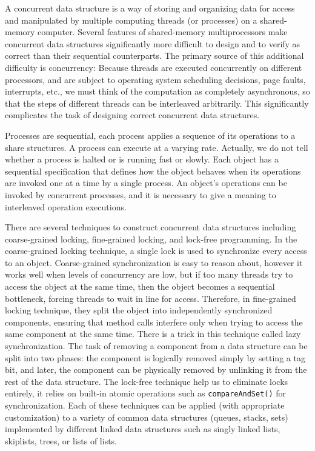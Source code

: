 A concurrent data structure is a way of storing and organizing data for access and manipulated by multiple computing threads (or processes) on a shared-memory computer. Several features of shared-memory multiprocessors make concurrent data structures significantly more difficult to design and to verify as correct than their sequential counterparts. The primary source of this additional difficulty is concurrency: Because threads are executed concurrently on different processors, and are subject to operating system scheduling decisions, page faults, interrupts, etc., we must think of the computation as completely asynchronous, so that the steps of different threads can be interleaved arbitrarily. This significantly complicates the task of designing correct concurrent data structures. 

Processes are sequential, each process applies a sequence of its operations to a share structures. A process can execute at a varying rate. Actually, we do not tell whether a process is halted or is running fast or slowly. Each object has a sequential specification that defines how the object behaves when its operations are
invoked one at a time by a single process. An object’s operations can be invoked by concurrent
processes, and it is necessary to give a meaning to interleaved operation
executions.

There are several techniques to construct concurrent data structures including coarse-grained locking, fine-grained locking, and lock-free programming. In the coarse-grained locking technique, a single lock is used to synchronize every access to an object. Coarse-grained synchronization is easy to reason about, however it works well when levels of concurrency are low, but if too many threads try to access the object at the same time, then the object becomes a sequential bottleneck, forcing threads to wait in line for access. Therefore, in fine-grained locking technique, they split the object into independently synchronized components, ensuring that method calls interfere only when trying to access the same component at the same time. There is a trick in this technique called lazy synchronization.  The task of removing a component from a data structure can be split into two phases: the component is logically removed simply by setting a tag bit, and later, the component can be physically removed by unlinking it from the rest of the data structure. The lock-free technique help us to eliminate locks entirely, it relies on built-in atomic operations such as {\tt compareAndSet()} for synchronization. Each of these techniques can be applied (with appropriate customization) to a variety of common data structures (queues, stacks, sets) implemented by different linked data structures such as singly linked lists, skiplists, trees, or lists of lists. 


